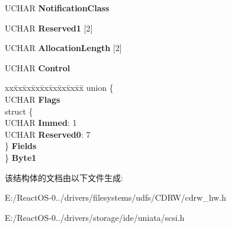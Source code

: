 \begin{DoxyCompactItemize}
\begin{tabbing}
\end{tabbing}\item 
\mbox{\label{struct___c_d_b_1_1___g_e_t___e_v_e_n_t___s_t_a_t_u_s_ab9dbb16420b2e20655309b1e442684b0}} 
U\+C\+H\+AR {\bfseries Notification\+Class}
\item 
\mbox{\label{struct___c_d_b_1_1___g_e_t___e_v_e_n_t___s_t_a_t_u_s_a69c1c14a5bda24230e444da0ce15cc64}} 
U\+C\+H\+AR {\bfseries Reserved1} \mbox{[}2\mbox{]}
\item 
\mbox{\label{struct___c_d_b_1_1___g_e_t___e_v_e_n_t___s_t_a_t_u_s_a21e329e0ecaf01600f03e16da6b6e7b0}} 
U\+C\+H\+AR {\bfseries Allocation\+Length} \mbox{[}2\mbox{]}
\item 
\mbox{\label{struct___c_d_b_1_1___g_e_t___e_v_e_n_t___s_t_a_t_u_s_a36b3d89895c106ecdd2f036cbb6954e8}} 
U\+C\+H\+AR {\bfseries Control}
\item 
\mbox{\label{struct___c_d_b_1_1___g_e_t___e_v_e_n_t___s_t_a_t_u_s_a05c883a6180884e6907f3b39594b7e50}} 
\begin{tabbing}
xx\=xx\=xx\=xx\=xx\=xx\=xx\=xx\=xx\=\kill
union \{\\
\>UCHAR {\bfseries Flags}\\
\>struct \{\\
\>\>UCHAR {\bfseries Immed}: 1\\
\>\>UCHAR {\bfseries Reserved0}: 7\\
\>\} {\bfseries Fields}\\
\} {\bfseries Byte1}\\

\end{tabbing}\end{DoxyCompactItemize}


该结构体的文档由以下文件生成\+:\begin{DoxyCompactItemize}
\item 
E\+:/\+React\+O\+S-\/0../drivers/filesystems/udfs/\+C\+D\+R\+W/cdrw\+\_\+hw.\+h\item 
E\+:/\+React\+O\+S-\/0../drivers/storage/ide/uniata/scsi.\+h\end{DoxyCompactItemize}
